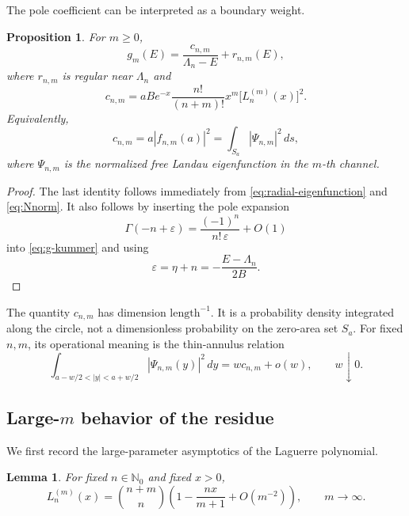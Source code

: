\documentclass[12pt,a4paper]{article}
\numberwithin{equation}{section}
\newtheorem{prop}[thm]{Proposition}
\newtheorem{lem}[thm]{Lemma}
\theoremstyle{remark}
\theoremstyle{definition}
\newcommand{\N}{\mathbb N}
\begin{document}
The pole coefficient can be interpreted as a boundary weight.

\begin{prop}\label{prop:boundary-weight}
For $m\ge0$,
\begin{equation}\label{eq:cdef}
g_m(E)
=\frac{c_{n,m}}{\Lambda_n-E}+r_{n,m}(E),
\end{equation}
where $r_{n,m}$ is regular near $\Lambda_n$ and
\begin{equation}\label{eq:c-exact}
c_{n,m}
=aB e^{-x}\frac{n!}{(n+m)!}x^m
\bigl[L_n^{(m)}(x)\bigr]^2.
\end{equation}
Equivalently,
$$
c_{n,m}=a|f_{n,m}(a)|^2
=\int_{S_a}|\Psi_{n,m}|^2\,d s,
$$
where $\Psi_{n,m}$ is the normalized free Landau eigenfunction in the
$m$-th channel.
\end{prop}

\begin{proof}
The last identity follows immediately from
\eqref{eq:radial-eigenfunction} and \eqref{eq:Nnorm}. It also follows by inserting
the pole expansion
$$
\Gamma(-n+\varepsilon)
=\frac{(-1)^n}{n!\,\varepsilon}+O(1)
$$
into \eqref{eq:g-kummer} and using
$$
\varepsilon
=\eta+n
=-\frac{E-\Lambda_n}{2B}.
$$
\end{proof}

The quantity $c_{n,m}$ has dimension $\mathrm{length}^{-1}$. It is a
probability density integrated along the circle, not a dimensionless
probability on the zero-area set $S_a$. For fixed $n,m$, its operational
meaning is the thin-annulus relation
\begin{equation}\label{eq:annulus-weight}
\int_{a-w/2<|y|<a+w/2}|\Psi_{n,m}(y)|^2\,d y
=w c_{n,m}+o(w),\qquad w\downarrow0.
\end{equation}

\subsection{Large-$m$ behavior of the residue}

We first record the large-parameter asymptotics of the Laguerre polynomial.

\begin{lem}\label{lem:lag-large-m}
For fixed $n\in\N_0$ and fixed $x>0$,
\begin{equation}\label{eq:lag-large-m}
L_n^{(m)}(x)
=\binom{n+m}{n}
\left(1-\frac{nx}{m+1}+O(m^{-2})\right),
\qquad m\to\infty.
\end{equation}
\end{lem}
\end{document}

